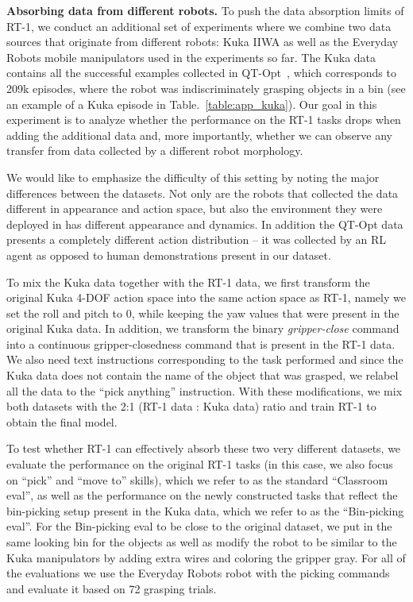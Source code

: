 \documentclass{article} %
\newcommand{\algname}{RT-1\xspace}
\begin{document}
\textbf{Absorbing data from different robots.}
To push the data absorption limits of \algname, we conduct an additional set of experiments where we combine two data sources that originate from different robots: Kuka IIWA as well as the Everyday Robots mobile manipulators used in the experiments so far. The Kuka data contains all the successful examples collected in QT-Opt~\citep{kalashnikov2018qtopt}, which corresponds to 209k episodes, where the robot was indiscriminately grasping objects in a bin (see an example of a Kuka episode in Table.~\ref{table:app_kuka}).
Our goal in this experiment is to analyze whether the performance on the \algname tasks drops when adding the additional data and, more importantly, whether we can observe any transfer from data collected by a different robot morphology.

We would like to emphasize the difficulty of this setting by noting the major differences between the datasets. Not only are the robots that collected the data different in appearance and action space, but also the environment they were deployed in has different appearance and dynamics. In addition the QT-Opt data presents a completely different action distribution -- it was collected by an RL agent as opposed to human demonstrations present in our dataset.

To mix the Kuka data together with the \algname data, we first transform the original Kuka 4-DOF action space into the same action space as \algname, namely we set the roll and pitch to $0$, while keeping the yaw values that were present in the original Kuka data. In addition, we transform the binary \textit{gripper-close} command into a continuous gripper-closedness command that is present in the \algname data. We also need text instructions corresponding to the task performed and since the Kuka data does not contain the name of the object that was grasped, we relabel all the data to the ``pick anything'' instruction. With these modifications, we mix both datasets with the 2:1 (\algname data : Kuka data) ratio and train \algname to obtain the final model.

To test whether \algname can effectively absorb these two very different datasets, we evaluate the performance on the original \algname tasks (in this case, we also focus on ``pick'' and ``move to'' skills), which we refer to as the standard ``Classroom eval'', as well as the performance on the newly constructed tasks that reflect the bin-picking setup present in the Kuka data, which we refer to as the ``Bin-picking eval''.  
For the Bin-picking eval to be close to the original dataset, we put in the same looking bin for the objects as well as modify the robot to be similar to the Kuka manipulators by adding extra wires and coloring the gripper gray. For all of the evaluations we use the Everyday Robots robot with the picking commands and evaluate it based on 72 grasping trials.
\end{document}
